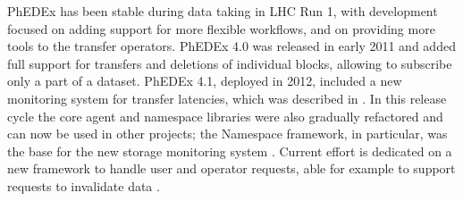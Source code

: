 PhEDEx has been stable during data taking in LHC Run 1, with development focused on adding support for more flexible workflows, and on providing more tools to the transfer operators.
PhEDEx 4.0 was released in early 2011 and added full support for transfers and deletions of individual blocks, allowing to subscribe only a part of a dataset. PhEDEx 4.1, deployed in 2012, included a new monitoring system for transfer latencies, which was described in \cite{phedexlatency}.
In this release cycle the core agent and namespace libraries were also gradually refactored \cite{phedexframework} and can now be used in other projects; the Namespace framework, in particular, was the base for the new storage monitoring system \cite{storagemon}.
Current effort is dedicated on a new framework to handle user and operator requests, able for example to support requests to invalidate data \cite{phedexrequests}.
